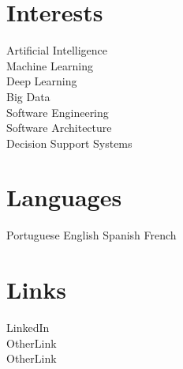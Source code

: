 \documentclass[]{deedy-resume-openfont}
\begin{document}
\begin{minipage}[t]{0.26\textwidth}
\section{Interests}
Artificial Intelligence \\
Machine Learning \\
Deep Learning \\
Big Data \\
Software Engineering \\
Software Architecture \\
Decision Support Systems
\sectionsep

\section{Languages}
Portuguese 
English 
Spanish 
French 
\sectionsep

\section{Links} 
LinkedIn  \href{https://goo.gl/R@ND0M}{} \\
OtherLink  \href{https://goo.gl/R@ND0M}{} \\
OtherLink  \href{https://goo.gl/r@ND0M}{} \\
\sectionsep


%
%

\end{minipage} 
\hfill
\end{document}
